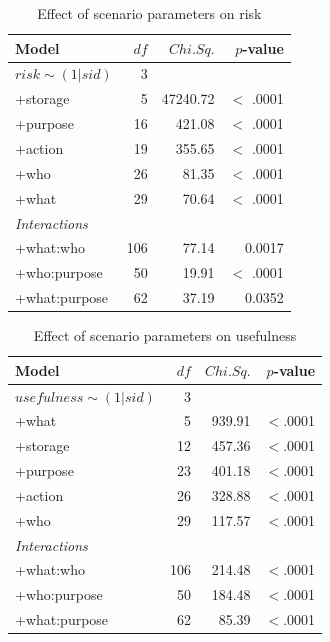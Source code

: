 \begin{table}
	\centering
	\caption{Effect of scenario parameters on risk}
	\label{tab:para_risk}
	\begin{tabular}{ l | r | r | r }
		\hline
		Model &	$df$ & $Chi. Sq.$ & $p$-value 	\\ \hline
		$risk\sim(1 | sid)$ &	3	  	&	    &				\\
		+storage &					5	& 	  47240.72 & 		$<$ .0001 	\\
		+purpose &					16 &		  421.08 &		$<$ .0001	\\
		+action &				19 & 	  355.65 & 		  	$<$ .0001	\\
		+who &			26 &		  81.35 & 		 $<$ .0001 	\\
		+what &			29 &		  70.64 & 		 $<$ .0001\\\hline
		\emph{Interactions}&			 &		  & \\\hline
		+what:who &			106 &		  77.14 & 		 0.0017\\
		+who:purpose &			50 &		  19.91 & 		$<$ .0001\\
		+what:purpose &			62 &		  37.19 & 		0.0352\\
		\hline
	\end{tabular}
\end{table}

\begin{table}
	\centering
	\caption{Effect of scenario parameters on usefulness}
	\label{tab:para_use}
	\begin{tabular}{ l | r | r | r }
		\hline
		Model &	$df$ & $Chi. Sq.$ & $p$-value 	\\ \hline
		$usefulness\sim(1 | sid)$ &	3	  	&	    &				\\
		+what &					5	& 	  939.91 & 		$<$.0001 	\\
		+storage &					12 &		  457.36 &		$<$.0001	\\
		+purpose &				23 & 	  401.18 & 		  	$<$.0001	\\
		+action &			26 &		  328.88 & 		 $<$.0001 	\\
		+who &			29 &		  117.57& 		 $<$.0001\\\hline
		\emph{Interactions}&			 &		  & \\\hline
		+what:who &			106 &		 214.48 & 		 $<$.0001\\
		+who:purpose &			50 &		  184.48 & 		$<$.0001\\
		+what:purpose &			62 &		  85.39 & 		$<$.0001\\
		\hline
	\end{tabular}
\end{table}

